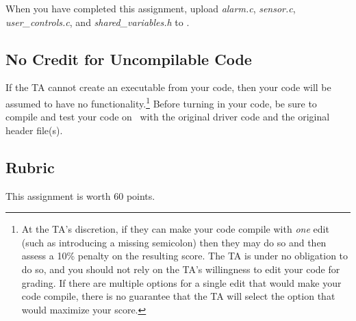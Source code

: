When you have completed this assignment, upload \textit{alarm.c}, \textit{sensor.c}, \textit{user\_controls.c}, and \textit{shared\_variables.h} to \filesubmission.

\subsection*{No Credit for Uncompilable Code}
If the TA cannot create an executable from your code, then your code will be assumed to have no functionality.\footnote{
    At the TA's discretion, if they can make your code compile with \textit{one} edit (such as introducing a missing semicolon) then they may do so and then assess a 10\% penalty on the resulting score.
    The TA is under no obligation to do so, and you should not rely on the TA's willingness to edit your code for grading.
    If there are multiple options for a single edit that would make your code compile, there is no guarantee that the TA will select the option that would maximize your score.
}
Before turning in your code, be sure to compile and test your code on \runtimeenvironment\ with the original driver code and the original header file(s).

\interruptlablatepolicy

\subsection*{Rubric}

This assignment is worth 60 points.

